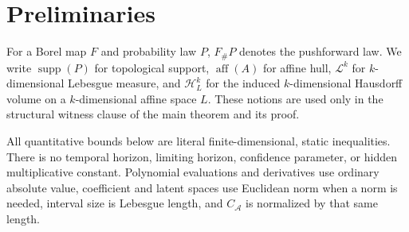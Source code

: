 \section{Preliminaries}

For a Borel map $F$ and probability law $P$, $F_\#P$ denotes the
pushforward law.  We write $\operatorname{supp}(P)$ for topological
support, $\operatorname{aff}(A)$ for affine hull, $\mathcal L^k$ for
$k$-dimensional Lebesgue measure, and $\mathcal H_L^k$ for the induced
$k$-dimensional Hausdorff volume on a $k$-dimensional affine space $L$.
These notions are used only in the structural witness clause of the main
theorem and its proof.

All quantitative bounds below are literal finite-dimensional, static
inequalities.  There is no temporal horizon, limiting horizon, confidence
parameter, or hidden multiplicative constant.  Polynomial evaluations and
derivatives use ordinary absolute value, coefficient and latent spaces use
Euclidean norm when a norm is needed, interval size is Lebesgue length, and
$C_{\mathcal A}$ is normalized by that same length.

